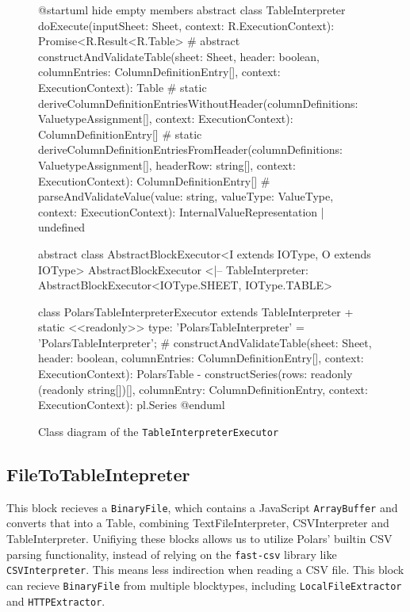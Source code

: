 \begin{figure}
	\begin{plantuml}
		@startuml
		hide empty members
		abstract class TableInterpreter {
		doExecute(inputSheet: Sheet, context: R.ExecutionContext): Promise<R.Result<R.Table>\>
		# {abstract} constructAndValidateTable(sheet: Sheet, header: boolean, columnEntries: ColumnDefinitionEntry[], context: ExecutionContext): Table
		# {static} deriveColumnDefinitionEntriesWithoutHeader(columnDefinitions: ValuetypeAssignment[], context: ExecutionContext): ColumnDefinitionEntry[]
		# {static} deriveColumnDefinitionEntriesFromHeader(columnDefinitions: ValuetypeAssignment[], headerRow: string[], context: ExecutionContext): ColumnDefinitionEntry[]
		# parseAndValidateValue(value: string, valueType: ValueType, context: ExecutionContext): InternalValueRepresentation | undefined
		}

		abstract class AbstractBlockExecutor<I extends IOType, O extends IOType>
		AbstractBlockExecutor <|-- TableInterpreter: AbstractBlockExecutor<IOType.SHEET, IOType.TABLE>

		class PolarsTableInterpreterExecutor extends TableInterpreter {
		+ {static} <<readonly>> type: 'PolarsTableInterpreter' = 'PolarsTableInterpreter';
		# constructAndValidateTable(sheet: Sheet, header: boolean, columnEntries: ColumnDefinitionEntry[], context: ExecutionContext): PolarsTable
		- constructSeries(rows: readonly (readonly string[])[], columnEntry: ColumnDefinitionEntry, context: ExecutionContext): pl.Series
		}
		@enduml
	\end{plantuml}
	\caption{Class diagram of the \Verb|TableInterpreterExecutor|}
	\label{fig:uml:tableinterpreter}
\end{figure}


\subsection{FileToTableIntepreter}
\label{subsection:FileToTableInterpreter}
This block recieves a \Verb|BinaryFile|, which contains a JavaScript \Verb|ArrayBuffer| and converts that into a Table, combining TextFileInterpreter, CSVInterpreter and TableInterpreter.
Unifiying these blocks allows us to utilize Polars' builtin \ac{CSV} parsing functionality, instead of relying on the \Verb|fast-csv| library like \Verb|CSVInterpreter|.
This means less indirection when reading a \ac{CSV} file.
This block can recieve \Verb|BinaryFile| from multiple blocktypes, including \Verb|LocalFileExtractor| and \Verb|HTTPExtractor|.

